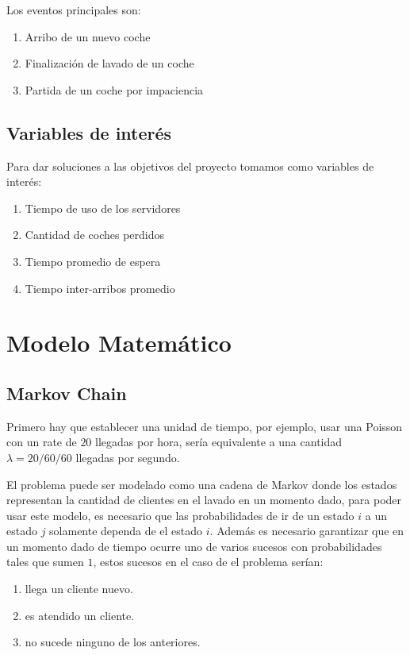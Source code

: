 \documentclass[14pt]{extarticle}
\begin{document}
Los eventos principales son:
\begin{enumerate}
    \item Arribo de un nuevo coche
    \item Finalización de lavado de un coche
    \item Partida de un coche por impaciencia     
\end{enumerate}

\subsection{Variables de interés}

Para dar soluciones a las objetivos del proyecto tomamos como variables de interés:
\begin{enumerate}

    \item  Tiempo de uso de los servidores
    \item  Cantidad de coches perdidos
    \item  Tiempo promedio de espera
    \item  Tiempo inter-arribos promedio
\end{enumerate}

\section{Modelo Matemático}

\subsection{Markov Chain}

Primero hay que establecer una unidad de tiempo, por ejemplo, usar una Poisson con un rate de $20$ llegadas por hora, sería equivalente a una cantidad $\lambda = 20 / 60 / 60$ llegadas por segundo. 

El problema puede ser modelado como una cadena de Markov donde los estados representan la cantidad de clientes en el lavado en un momento dado, para poder usar este modelo, es necesario que las probabilidades de ir de un estado $i$ a un estado $j$ solamente dependa de el estado $i$. Además es necesario garantizar que en un momento dado de tiempo ocurre uno de varios sucesos con probabilidades tales que sumen $1$, estos sucesos en el caso de el problema serían:

\begin{enumerate}
    \item llega un cliente nuevo.
    \item es atendido un cliente.
    \item no sucede ninguno de los anteriores.
\end{enumerate}
	
\end{document}
